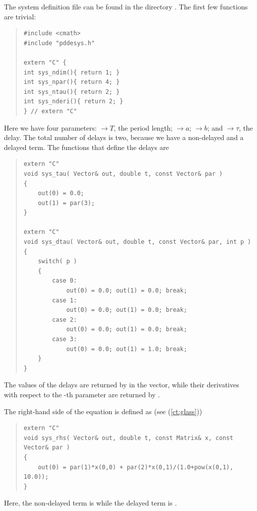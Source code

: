 \documentclass[10pt,a4paper]{ddedoc}
\begin{document}
The system definition file can be found in the directory
. The first few functions are trivial:
{ \small \begin{quote} \begin{lstlisting}[frame=single]
#include <cmath>
#include "pddesys.h"

extern "C" {
int sys_ndim(){ return 1; }
int sys_npar(){ return 4; }
int sys_ntau(){ return 2; }
int sys_nderi(){ return 2; }
} // extern "C"
\end{lstlisting} \end{quote} } \noindent
Here we have four parameters:
$\to T$, the period length;
$\to a$;
$\to b$; and
$\to \tau$, the delay.
The total number of delays is two, because we have a non-delayed and a delayed term.
The functions that define the delays are
{ \small \begin{quote} \begin{lstlisting}[frame=single]
extern "C"
void sys_tau( Vector& out, double t, const Vector& par ) 
{
	out(0) = 0.0;
	out(1) = par(3);
}

extern "C"
void sys_dtau( Vector& out, double t, const Vector& par, int p ) 
{
	switch( p )
	{
		case 0:
			out(0) = 0.0; out(1) = 0.0; break;
		case 1:
			out(0) = 0.0; out(1) = 0.0; break;
		case 2:
			out(0) = 0.0; out(1) = 0.0; break;
		case 3:
			out(0) = 0.0; out(1) = 1.0; break;
	}
}
\end{lstlisting} \end{quote} } \noindent
The values of the delays are returned by  in the  vector, while their derivatives with respect to the -th parameter are returned by .

The right-hand side of the equation is defined as (see (\ref{ct:glass}))
{ \small \begin{quote} \begin{lstlisting}[frame=single]
extern "C"
void sys_rhs( Vector& out, double t, const Matrix& x, const Vector& par )
{
	out(0) = par(1)*x(0,0) + par(2)*x(0,1)/(1.0+pow(x(0,1), 10.0));
}
\end{lstlisting} \end{quote} } \noindent
Here, the non-delayed term is  while the delayed term
is .
\end{document}
